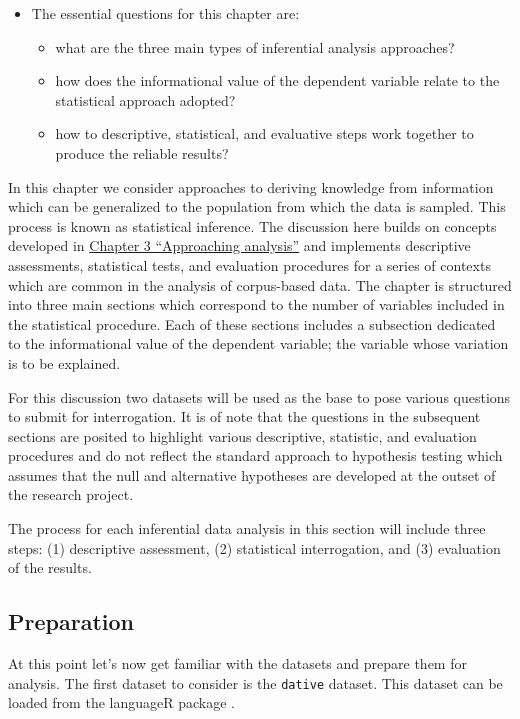 \documentclass[
]{article}
\providecommand{\tightlist}{%
  \setlength{\itemsep}{0pt}\setlength{\parskip}{0pt}}
\newenvironment{rmdblock}[1]
  {\begin{shaded*}
  \begin{itemize}
  \renewcommand{\labelitemi}{
    \raisebox{-.5\height}[0pt][0pt]{
      {\setkeys{Gin}{width=2em,keepaspectratio}\texttt{[image: assets/images/\#1]}}
    }
  }
  \item
  }
  {
  \end{itemize}
  \end{shaded*}
  }
\newenvironment{rmdkey}
  {\begin{rmdblock}{key}}
  {\end{rmdblock}}
\begin{document}
\begin{rmdkey}
The essential questions for this chapter are:

\begin{itemize}
\tightlist
\item
  what are the three main types of inferential analysis approaches?
\item
  how does the informational value of the dependent variable relate to
  the statistical approach adopted?
\item
  how to descriptive, statistical, and evaluative steps work together to
  produce the reliable results?
\end{itemize}
\end{rmdkey}

In this chapter we consider approaches to deriving knowledge from information which can be generalized to the population from which the data is sampled. This process is known as statistical inference. The discussion here builds on concepts developed in \protect\hyperlink{approaching-analysis}{Chapter 3 ``Approaching analysis''} and implements descriptive assessments, statistical tests, and evaluation procedures for a series of contexts which are common in the analysis of corpus-based data. The chapter is structured into three main sections which correspond to the number of variables included in the statistical procedure. Each of these sections includes a subsection dedicated to the informational value of the dependent variable; the variable whose variation is to be explained.

For this discussion two datasets will be used as the base to pose various questions to submit for interrogation. It is of note that the questions in the subsequent sections are posited to highlight various descriptive, statistic, and evaluation procedures and do not reflect the standard approach to hypothesis testing which assumes that the null and alternative hypotheses are developed at the outset of the research project.

The process for each inferential data analysis in this section will include three steps: (1) descriptive assessment, (2) statistical interrogation, and (3) evaluation of the results.

\hypertarget{preparation}{%
\subsection{Preparation}\label{preparation}}

At this point let's now get familiar with the datasets and prepare them for analysis. The first dataset to consider is the \texttt{dative} dataset. This dataset can be loaded from the languageR package \citep{R-languageR}.
\end{document}
